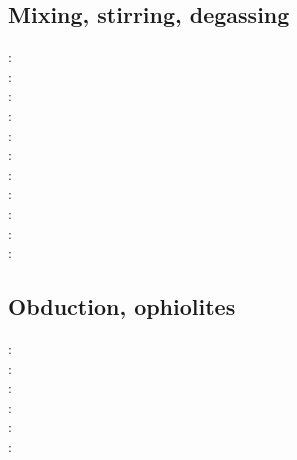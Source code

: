 \subsection{Mixing, stirring, degassing} 

\begin{scriptsize}
\nineteeneightyfour: \cite{olyb84}\\
\nineteenninety: \cite{ketu90}\\
\nineteenninetysix: \cite{pelt96}\\
\nineteenninetynine: \cite{cori99}\\
\twothousandone: \cite{huke01}\\
\twothousandtwo: \cite{vahb02}\\
\twothousandthree: \cite{fasa03}\cite{vabh03}\\
\twothousandfive: \cite{colt05}\\
\twothousandseven: \cite{gogc07}\cite{nake07}\cite{vabh07}\\
\twothousandeleven: \cite{lemj11}\cite{saad11}\\
\twothousandeighteen: \cite{onzh18}
\end{scriptsize}

\subsection{Obduction, ophiolites}
 

\begin{scriptsize}
\nineteenninety: \cite{hack90}\\
\nineteenninetyone: \cite{hack91}\\
\twothousand: \cite{mokd00}\\
\twothousandfourteen: \cite{agzf14}\\
\twothousandsixteen: \cite{duay16}\\
\twothousandtwenty: \cite{rohb20}
\end{scriptsize}

